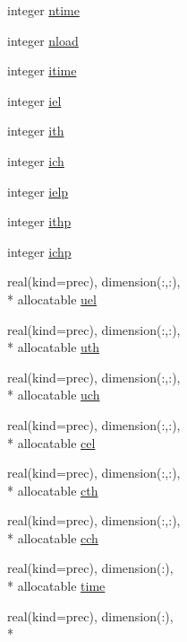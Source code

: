\begin{DoxyCompactItemize}
\item 
integer \hyperlink{classinputvar_a30d8dd7bcf1952df019939f8ad23b6e2}{ntime}
\item 
integer \hyperlink{classinputvar_ac924c0b7af6a3dbae99f1a60dc9242ab}{nload}
\item 
integer \hyperlink{classinputvar_a06f760a3ae10a8b9834a7e0d270d1d59}{itime}
\item 
integer \hyperlink{classinputvar_a6f9a3a8beea8f6e1aa8140bab654a48f}{iel}
\item 
integer \hyperlink{classinputvar_a4bba5fd8a8c399940c4b81e4da0cc9ce}{ith}
\item 
integer \hyperlink{classinputvar_a69cdcc78492d1a96e3f02ee2915f207d}{ich}
\item 
integer \hyperlink{classinputvar_a0190bc42c3dad91d811c585952ff55f4}{ielp}
\item 
integer \hyperlink{classinputvar_abb9734f3e3ee40c97881bd03881065c5}{ithp}
\item 
integer \hyperlink{classinputvar_af57151a30c510558682b98e1b72d844b}{ichp}
\item 
real(kind=prec), dimension(\-:,\-:), \\*
allocatable \hyperlink{classinputvar_a8540cf286b75c5a77a2c3f8e2623617a}{uel}
\item 
real(kind=prec), dimension(\-:,\-:), \\*
allocatable \hyperlink{classinputvar_abd9a09032c8d997c45cd49020fb78609}{uth}
\item 
real(kind=prec), dimension(\-:,\-:), \\*
allocatable \hyperlink{classinputvar_a53339aa6533c8e2333ec3eaa4a54796b}{uch}
\item 
real(kind=prec), dimension(\-:,\-:), \\*
allocatable \hyperlink{classinputvar_aae07469e8800dce385d02a73306d320c}{cel}
\item 
real(kind=prec), dimension(\-:,\-:), \\*
allocatable \hyperlink{classinputvar_adcb3f28e49daee36d91bc87941f486c9}{cth}
\item 
real(kind=prec), dimension(\-:,\-:), \\*
allocatable \hyperlink{classinputvar_a88bb670dc0bca944104c292071818a36}{cch}
\item 
real(kind=prec), dimension(\-:), \\*
allocatable \hyperlink{classinputvar_a7d20a57b0a7dfe6c386e831f25636546}{time}
\item 
real(kind=prec), dimension(\-:), \\*

\end{DoxyCompactItemize}
